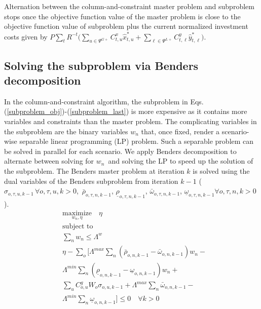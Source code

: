 \documentclass[final]{IEEEtran}
\begin{document}
Alternation between the column-and-constraint master problem and subproblem stops once the objective function value of the master problem is close to the objective function value of subproblem plus the current normalized investment costs given by $P \sum\limits_{t} R^{-t} \big( \sum\limits_{u \in \Psi^{G+}} C^x_{t, u} \hat{x}_{t, u}^* + \sum\limits_{\ell \in \Psi^{L+}} C^y_{t, \ell} \hat{y}_{t, \ell}^* \big)$.

\subsection{Solving the subproblem via Benders decomposition}

In the column-and-constraint algorithm, the subproblem in Eqs. (\ref{subproblem_obj})-(\ref{subproblem_last}) is more expensive as it contains more variables and constraints than the master problem. The complicating variables in the subproblem are the binary variables $w_n$ that, once fixed, render a scenario-wise separable linear programming (LP) problem. Such a separable problem can be solved in parallel for each scenario. We apply Benders decomposition to alternate between solving for $w_n$ and solving the LP to speed up the solution of the subproblem. The Benders master problem at iteration $k$ is solved using the dual variables of the Benders subproblem from iteration $k-1$ ($\sigma_{o, \tau, u, k-1} \, \forall o, \tau, u, k > 0$, $\, \bar{\rho}_{o, \tau, n, k-1}$, $\underline{\rho}_{o, \tau, n, k-1}$, $\bar{\omega}_{o, \tau, n, k-1}$, $\underline{\omega}_{o, \tau, n, k-1} \forall o, \tau, n, k > 0$).
\begin{align}
&\label{benders_master_obj} \underset{w_n, \eta} {\text{maximize}} \quad \eta \\
&\text{subject to} \nonumber \\
&\sum\limits_n w_n \leq \Lambda^w \\
&\eta - \sum\limits_o \Big[ \Lambda^{max} \sum\limits_n (\bar{\rho}_{o, n, k-1} - \bar{\omega}_{o, n, k-1}) w_n - \nonumber \\
&\Lambda^{min} \sum\limits_n (\underline{\rho}_{o, n, k-1} - \underline{\omega}_{o, n, k-1})  w_n + \nonumber \\
&\sum\limits_u C^g_{o,u} W_o \sigma_{o, u, k-1} + \Lambda^{max} \sum\limits_n \bar{\omega}_{o, n, k-1} - \nonumber \\
&\label{benders_master_last}\Lambda^{min} \sum\limits_n \underline{\omega}_{o, n, k-1} \Big] \leq 0 \quad \forall k > 0
\end{align}
\end{document}
